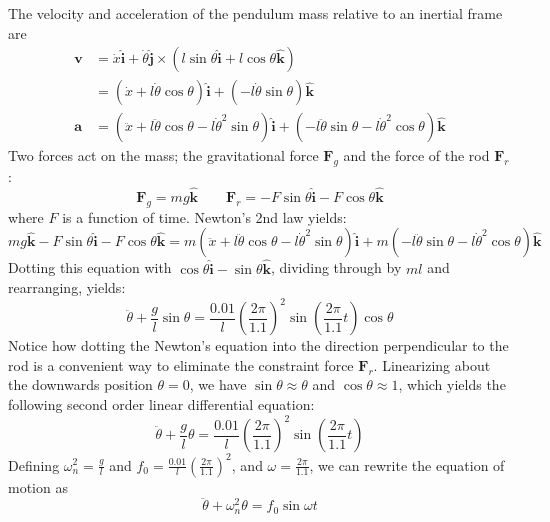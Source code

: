 \documentclass[letter, 11pt]{article}
\begin{document}
The velocity and acceleration of the pendulum mass relative to an inertial
frame are
\begin{align*}
\mathbf{v} &= \dot{x}\hat{\mathbf{i}} + \dot{\theta} \hat{\mathbf{j}} \times \left(l
\sin \theta \hat{\mathbf{i}} + l \cos \theta \hat{\mathbf{k}}\right)\\
&= \left(\dot{x} + l \dot{\theta} \cos \theta \right)\hat{\mathbf{i}} +
\left(-l \dot{\theta} \sin \theta \right) \hat{\mathbf{k}} \\
\mathbf{a} &= (\ddot{x} + l \ddot{\theta} \cos \theta - l \dot{\theta}^2 \sin
\theta) \hat{\mathbf{i}} + (-l \ddot{\theta} \sin \theta - l \dot{\theta}^2
\cos\theta)\hat{\mathbf{k}}
\end{align*}
Two forces act on the mass; the gravitational force $\mathbf{F}_g$ and the force
of the rod $\mathbf{F}_r$:
\[
\mathbf{F}_g = mg\hat{\mathbf{k}} \qquad \mathbf{F}_r = - F \sin \theta
\hat{\mathbf{i}} - F \cos \theta \hat{\mathbf{k}}
\]
where $F$ is a function of time.  Newton's 2nd law yields:
\[
mg\hat{\mathbf{k}} - F \sin \theta \hat{\mathbf{i}} - F \cos \theta
\hat{\mathbf{k}} = m (\ddot{x} + l \ddot{\theta} \cos \theta - l \dot{\theta}^2 \sin
\theta) \hat{\mathbf{i}} + m (-l \ddot{\theta} \sin \theta - l \dot{\theta}^2
\cos\theta)\hat{\mathbf{k}}
\]
Dotting this equation with $\cos\theta\hat{\mathbf{i}} - \sin \theta \hat{\mathbf{k}}$, dividing
through by $ml$ and rearranging, yields:
\[
\ddot{\theta} + \frac{g}{l} \sin \theta =
\frac{0.01}{l}\left(\frac{2\pi}{1.1}\right)^2\sin\left(\frac{2\pi}{1.1}t\right) \cos
\theta
\]
Notice how dotting the Newton's equation into the direction perpendicular to
the rod is a convenient way to eliminate the constraint force
$\mathbf{F}_r$. Linearizing about the downwards position $\theta = 0$, we have
$\sin \theta \approx \theta$ and $\cos \theta \approx 1$, which yields the
following second order linear differential equation:
\[
\ddot{\theta} + \frac{g}{l} \theta =
\frac{0.01}{l}\left(\frac{2\pi}{1.1}\right)^2\sin\left(\frac{2\pi}{1.1}t\right)
\]
Defining $\omega_n^2 = \frac{g}{l}$ and $f_0 =
\frac{0.01}{l}\left(\frac{2\pi}{1.1}\right)^2$, and $\omega = \frac{2\pi}{1.1}$, we can
rewrite the equation of motion as
\[
\ddot{\theta} + \omega_n^2 \theta = f_0 \sin \omega t
\]
\end{document}
